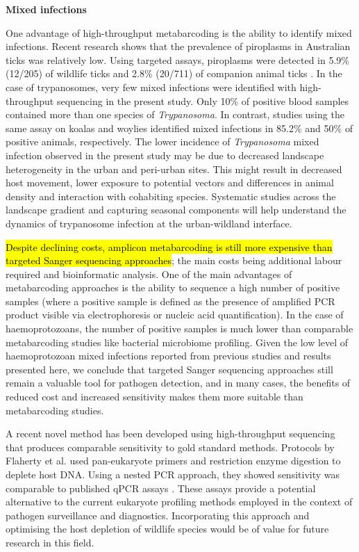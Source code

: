 \documentclass[a4paper, nobind]{templates/ociamthesis}
\begin{document}
\textbf{Mixed infections}

One advantage of high-throughput metabarcoding is the ability to identify mixed infections. Recent research shows that the prevalence of piroplasms in Australian ticks was relatively low.
Using targeted assays, piroplasms were detected in 5.9\% (12/205) of wildlife ticks \autocite{lohMolecularSurveillancePiroplasms2018} and 2.8\% (20/711) of companion animal ticks \autocite{greayEndemicExoticNovel2018}.
In the case of trypanosomes, very few mixed infections were identified with high-throughput sequencing in the present study.
Only 10\% of positive blood samples contained more than one species of \emph{Trypanosoma}.
In contrast, studies using the same assay on koalas and woylies identified mixed infections in 85.2\% \autocite{barbosaIncreasedGeneticDiversity2017} and 50\% \autocite{cooperNextGenerationSequencing2018} of positive animals, respectively.
The lower incidence of \emph{Trypanosoma} mixed infection observed in the present study may be due to decreased landscape heterogeneity in the urban and peri-urban sites.
This might result in decreased host movement, lower exposure to potential vectors and differences in animal density and interaction with cohabiting species.
Systematic studies across the landscape gradient and capturing seasonal components will help understand the dynamics of trypanosome infection at the urban-wildland interface.

\hl{Despite declining costs, amplicon metabarcoding is still more expensive than targeted Sanger sequencing approaches}; the main costs being additional labour required and bioinformatic analysis.
One of the main advantages of metabarcoding approaches is the ability to sequence a high number of positive samples (where a positive sample is defined as the presence of amplified PCR product visible via electrophoresis or nucleic acid quantification).
In the case of haemoprotozoans, the number of positive samples is much lower than comparable metabarcoding studies like bacterial microbiome profiling.
Given the low level of haemoprotozoan mixed infections reported from previous studies \autocite{hugginsNovelMetabarcodingDiagnostic2019} and results presented here, we conclude that targeted Sanger sequencing approaches still remain a valuable tool for pathogen detection, and in many cases, the benefits of reduced cost and increased sensitivity makes them more suitable than metabarcoding studies.

A recent novel method has been developed using high-throughput sequencing that produces comparable sensitivity to gold standard methods. Protocols by Flaherty et al. \autocite*{flahertyRestrictionEnzymeDigestion2018,flahertySensitiveUniversalDetection2021} used pan-eukaryote primers and restriction enzyme digestion to deplete host DNA. Using a nested PCR approach, they showed sensitivity was comparable to published qPCR assays \autocite{flahertySensitiveUniversalDetection2021}.
These assays provide a potential alternative to the current eukaryote profiling methods employed in the context of pathogen surveillance and diagnostics.
Incorporating this approach and optimising the host depletion of wildlife species would be of value for future research in this field.
\end{document}
